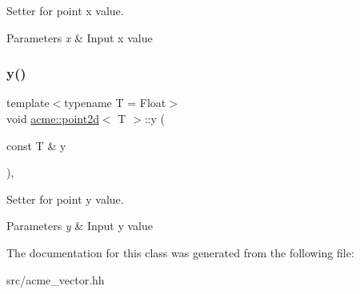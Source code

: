 Setter for point x value. 


\begin{DoxyParams}{Parameters}
{\em x} & Input x value \\
\hline
\end{DoxyParams}
\mbox{\label{classacme_1_1point2d_ab1baab0e82e178f1e828a25fa8dbb1c8}} 
\subsubsection{\texorpdfstring{y()}{y()}}
{\footnotesize\ttfamily template$<$typename T = Float$>$ \\
void \hyperlink{classacme_1_1point2d}{acme\+::point2d}$<$ T $>$\+::y (\begin{DoxyParamCaption}\item[{const T \&}]{y }\end{DoxyParamCaption})\hspace{0.3cm}{\ttfamily [inline]}, {\ttfamily [inherited]}}



Setter for point y value. 


\begin{DoxyParams}{Parameters}
{\em y} & Input y value \\
\hline
\end{DoxyParams}


The documentation for this class was generated from the following file\+:\begin{DoxyCompactItemize}
\item 
src/acme\+\_\+vector.\+hh\end{DoxyCompactItemize}
